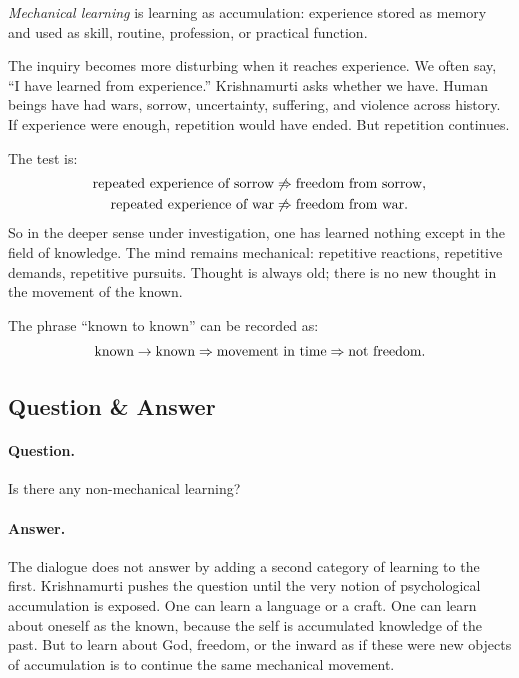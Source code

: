 \begin{definition}
\emph{Mechanical learning} is learning as accumulation: experience stored as memory and used as skill, routine, profession, or practical function.
\end{definition}

The inquiry becomes more disturbing when it reaches experience. We often say, ``I have learned from experience.'' Krishnamurti asks whether we have. Human beings have had wars, sorrow, uncertainty, suffering, and violence across history. If experience were enough, repetition would have ended. But repetition continues.

The test is:
\begin{align}
\hbox{repeated experience of sorrow}
&\not\Rightarrow
\hbox{freedom from sorrow},\\
\hbox{repeated experience of war}
&\not\Rightarrow
\hbox{freedom from war}.
\end{align}
So in the deeper sense under investigation, one has learned nothing except in the field of knowledge. The mind remains mechanical: repetitive reactions, repetitive demands, repetitive pursuits. Thought is always old; there is no new thought in the movement of the known.

The phrase ``known to known'' can be recorded as:
\begin{equation}
\hbox{known}\to\hbox{known}
\Rightarrow
\hbox{movement in time}
\Rightarrow
\hbox{not freedom}.
\end{equation}

\subsection{Question \& Answer}

\paragraph{Question.}
Is there any non-mechanical learning?

\paragraph{Answer.}
The dialogue does not answer by adding a second category of learning to the first. Krishnamurti pushes the question until the very notion of psychological accumulation is exposed. One can learn a language or a craft. One can learn about oneself as the known, because the self is accumulated knowledge of the past. But to learn about God, freedom, or the inward as if these were new objects of accumulation is to continue the same mechanical movement.


